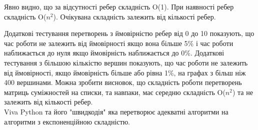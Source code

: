 \documentclass{article}
\begin{document}
Явно видно, що за відсутності ребер складність O(1). При наявності ребер складність O($n^2$). Очікувана складність залежить від кількості ребер.\\\indent

Додаткові тестування перетворень з ймовірністю ребер від 0 до 10 показують, що час роботи не залежить від ймовірності якщо вона більше 5\% і час роботи наближається до нуля якщо ймовірність наближається до 0\%. Додаткові тестування з більшою кількістю вершин показують, що час роботи не залежить від ймовірності, якщо ймовірність більше або рівна 1\%, на графах з більш ніж 400 вершинами. Можна зробити висновок, що складність роботи перетворень матриць суміжностей на списки, та навпаки, має середню складність O($n^2$) та не залежить від кількості ребер. \\\indent
 Viva Python та його "швидкодія" яка перетворює адекватні алгоритми на алгоритми з експоненційною складністю.
\end{document}
